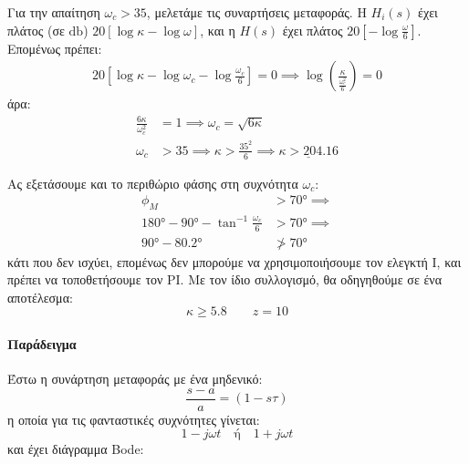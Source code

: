 \documentclass[11pt,a4paper,notitlepage,fleqn]{article}
\begin{document}
\begin{exercise}[Εφαρμογή]
Για την απαίτηση \( \omega_c > 35 \), μελετάμε τις συναρτήσεις μεταφοράς.
Η \( H_i(s) \) έχει πλάτος (σε \( \si{\decibel} \)) \( 20\left[\log κ - \log\omega\right] \),
και η \( H(s) \) έχει πλάτος \( 20\left[-\log\frac{\omega}{6}\right] \). Επομένως πρέπει:
\begin{align*}
	20\left[\log κ - \log \omega_c - \log\frac{\omega_c}{6}\right] = 0
	\implies \log\left( \frac{κ}{\frac{\omega_c^2}{6}} \right) = 0
\end{align*}
άρα:
\begin{align*}
	\frac{6κ}{\omega_c^2} &= 1 \implies \omega_c = \sqrt{6κ} \\
	\omega_c &>35 \implies κ > \frac{35^2}{6} \implies \underline{κ > 204.16}
\end{align*}

Ας εξετάσουμε και το περιθώριο φάσης στη συχνότητα \( \omega_c \):
\begin{align*}
	\phi_M &> \ang{70} \implies \\
	\ang{180} - \ang{90} - \tan^{-1}\frac{\omega_c}{6} &> \ang{70} \implies \\
	\ang{90} - \ang{80.2} &\ngtr \ang{70}
\end{align*}
κάτι που δεν ισχύει, επομένως δεν μπορούμε να χρησιμοποιήσουμε τον ελεγκτή I, και πρέπει
να τοποθετήσουμε τον PI. Με τον ίδιο συλλογισμό, θα οδηγηθούμε σε ένα αποτέλεσμα:
\[
κ \geq 5.8\qquad z=10
\]

\end{exercise}
\paragraph{Παράδειγμα}
Έστω η συνάρτηση μεταφοράς με ένα μηδενικό:
\[
\frac{s-a}{a} = (1-sτ)
\]
η οποία για τις φανταστικές συχνότητες γίνεται:
\[
1-j\omega t \quad \text{ή} \quad 1+j\omega t
\]
και έχει διάγραμμα Bode:
\end{document}
